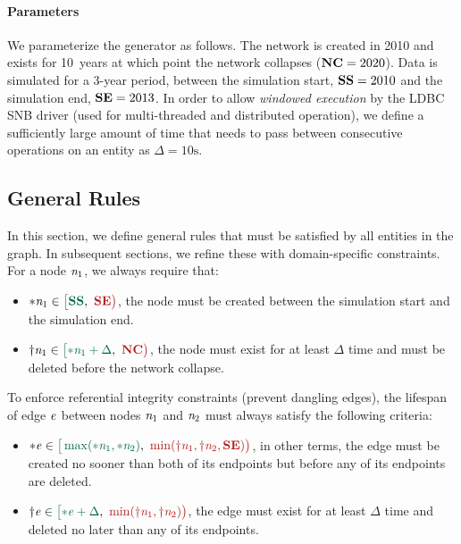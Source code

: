 \paragraph{Parameters} %
We parameterize the generator as follows.
The network is created in 2010 and exists for 10~years at which point the network collapses ($\textbf{NC} = 2020$).
Data is simulated for a 3-year period, between the simulation start, $\textbf{SS} = 2010$ and the simulation end, $\textbf{SE} = 2013$.
In order to allow \emph{windowed execution} by the LDBC SNB driver (used for multi-threaded and distributed operation), we define a sufficiently large amount of time that needs to pass between consecutive operations on an entity as $\Delta = 10\text{s}$.


\subsection{General Rules}

In this section, we define general rules that must be satisfied by all entities in the graph. In subsequent sections, we refine these with domain-specific constraints.
For a node $\mathit{n}_\mathrm{1}$, we always require that:
\begin{itemize}
    \item $\varcn{1} \in \interval{\xSS}{\xSE}$, the node must be created between the simulation start and the simulation end.
    \item $\vardn{1} \in \interval{\varcn{1} + \Delta}{\xNC}$, the node must exist for at least $\Delta$ time and must be deleted before the network collapse.
\end{itemize}


To enforce referential integrity constraints (\ie prevent dangling edges), the lifespan of edge $\mathit{e}$ between nodes $\mathit{n}_\mathrm{1}$ and $\mathit{n}_\mathrm{2}$ must always satisfy the following criteria:

\begin{itemize}
    \item $ \varc{e} \in \interval
        {\max(\varcn{1}, \varcn{2})}
        {\min(\vardn{1}, \vardn{2}, \xSE)} $,
        in other terms,
        the edge must be created no sooner than both of its endpoints
        but before
        any of its endpoints are deleted.
    \item $ \vard{e} \in \interval
        {\varc{e} + \Delta}
        {\min(\vardn{1}, \vardn{2})} $,
        \ie the edge must exist for at least $\Delta$ time and
        deleted no later than
        any of its endpoints.
\end{itemize}

